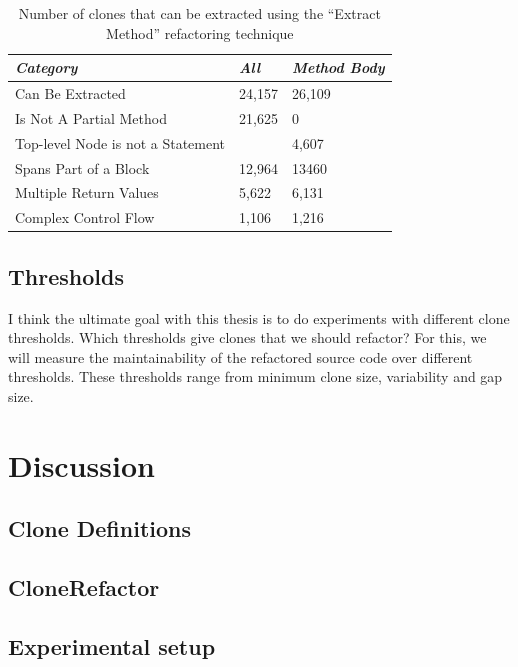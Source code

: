 \documentclass[sigconf,review]{acmart}
\begin{document}
\begin{table}[]
\centering
\begin{tabular}{@{}lll@{}}
\toprule
\rowcolor[HTML]{C0C0C0}
\textit{\textbf{Category}} & \textit{\textbf{All}} & \textit{\textbf{Method Body}} \\ \midrule
\rowcolor[HTML]{EFEFEF}
Can Be Extracted & 24,157 & 26,109 \\
Is Not A Partial Method & 21,625 & 0 \\
\rowcolor[HTML]{EFEFEF}
Top-level Node is not a Statement &  & 4,607 \\
Spans Part of a Block & 12,964 & 13460 \\
\rowcolor[HTML]{EFEFEF}
Multiple Return Values & 5,622 & 6,131 \\
Complex Control Flow & 1,106 & 1,216 \\ \bottomrule
\end{tabular}
\caption{Number of clones that can be extracted using the ``Extract Method'' refactoring technique}
\label{tab:refactorability}
\end{table}

\subsection{Thresholds}
I think the ultimate goal with this thesis is to do experiments with different clone thresholds. Which thresholds give clones that we should refactor? For this, we will measure the maintainability of the refactored source code over different thresholds. These thresholds range from minimum clone size, variability and gap size.

\section{Discussion}
\subsection{Clone Definitions}

\subsection{CloneRefactor}

\subsection{Experimental setup}
\end{document}
